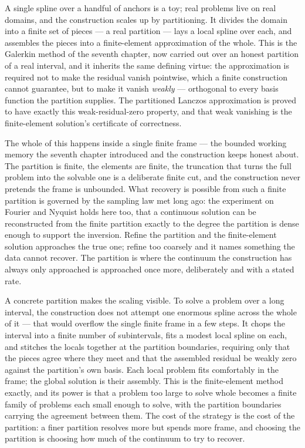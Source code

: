 A single spline over a handful of anchors is a toy; real problems live on real domains, and the
construction scales up by partitioning. It divides the domain into a finite set of pieces --- a real
partition --- lays a local spline over each, and assembles the pieces into a finite-element
approximation of the whole. This is the Galerkin method of the seventh chapter, now carried out over
an honest partition of a real interval, and it inherits the same defining virtue: the approximation is
required not to make the residual vanish pointwise, which a finite construction cannot guarantee, but
to make it vanish \emph{weakly} --- orthogonal to every basis function the partition supplies. The
partitioned Lanczos approximation is proved to have exactly this weak-residual-zero property, and that
weak vanishing is the finite-element solution's certificate of correctness.

The whole of this happens inside a single finite frame --- the bounded working memory the seventh
chapter introduced and the construction keeps honest about. The partition is finite, the elements are
finite, the truncation that turns the full problem into the solvable one is a deliberate finite cut,
and the construction never pretends the frame is unbounded. What recovery is possible from such a
finite partition is governed by the sampling law met long ago: the experiment on Fourier and Nyquist
holds here too, that a continuous solution can be reconstructed from the finite partition exactly to
the degree the partition is dense enough to support the inversion. Refine the partition and the
finite-element solution approaches the true one; refine too coarsely and it names something the data
cannot recover. The partition is where the continuum the construction has always only approached is
approached once more, deliberately and with a stated rate.

A concrete partition makes the scaling visible. To solve a problem over a long interval, the
construction does not attempt one enormous spline across the whole of it --- that would overflow the
single finite frame in a few steps. It chops the interval into a finite number of subintervals, fits a
modest local spline on each, and stitches the locals together at the partition boundaries, requiring
only that the pieces agree where they meet and that the assembled residual be weakly zero against the
partition's own basis. Each local problem fits comfortably in the frame; the global solution is their
assembly. This is the finite-element method exactly, and its power is that a problem too large to solve
whole becomes a finite family of problems each small enough to solve, with the partition boundaries
carrying the agreement between them. The cost of the strategy is the cost of the partition: a finer
partition resolves more but spends more frame, and choosing the partition is choosing how much of the
continuum to try to recover.

